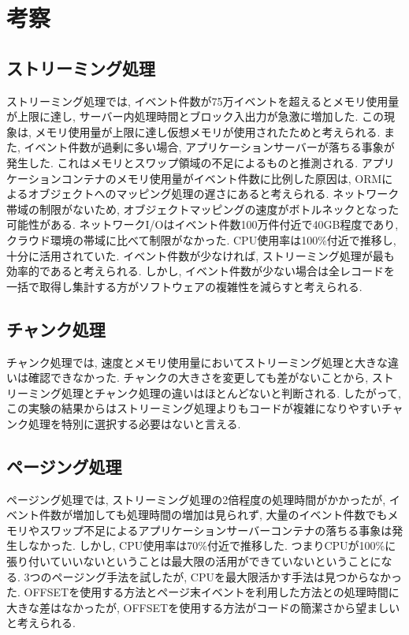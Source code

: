 \documentclass[../../main]{subfiles}
\begin{document}
    \section{考察}\label{sec:consideration}

    \subsection{ストリーミング処理}\label{subsec:consideration-streaming}

    ストリーミング処理では, イベント件数が75万イベントを超えるとメモリ使用量が上限に達し, サーバー内処理時間とブロック入出力が急激に増加した. この現象は, メモリ使用量が上限に達し仮想メモリが使用されたためと考えられる. また, イベント件数が過剰に多い場合, アプリケーションサーバーが落ちる事象が発生した. これはメモリとスワップ領域の不足によるものと推測される. アプリケーションコンテナのメモリ使用量がイベント件数に比例した原因は, ORMによるオブジェクトへのマッピング処理の遅さにあると考えられる. ネットワーク帯域の制限がないため, オブジェクトマッピングの速度がボトルネックとなった可能性がある. ネットワークI/Oはイベント件数100万件付近で40GB程度であり, クラウド環境の帯域に比べて制限がなかった. CPU使用率は100\%付近で推移し, 十分に活用されていた. イベント件数が少なければ, ストリーミング処理が最も効率的であると考えられる. しかし, イベント件数が少ない場合は全レコードを一括で取得し集計する方がソフトウェアの複雑性を減らすと考えられる.

    \subsection{チャンク処理}\label{subsec:consideration-chunk}

    チャンク処理では, 速度とメモリ使用量においてストリーミング処理と大きな違いは確認できなかった. チャンクの大きさを変更しても差がないことから, ストリーミング処理とチャンク処理の違いはほとんどないと判断される. したがって, この実験の結果からはストリーミング処理よりもコードが複雑になりやすいチャンク処理を特別に選択する必要はないと言える.

    \subsection{ページング処理}\label{subsec:consideration-paging}

    ページング処理では, ストリーミング処理の2倍程度の処理時間がかかったが, イベント件数が増加しても処理時間の増加は見られず, 大量のイベント件数でもメモリやスワップ不足によるアプリケーションサーバーコンテナの落ちる事象は発生しなかった. しかし, CPU使用率は70\%付近で推移した. つまりCPUが100\%に張り付いていいないということは最大限の活用ができていないということになる. 3つのページング手法を試したが, CPUを最大限活かす手法は見つからなかった. OFFSETを使用する方法とページ末イベントを利用した方法との処理時間に大きな差はなかったが, OFFSETを使用する方法がコードの簡潔さから望ましいと考えられる.
\end{document}
